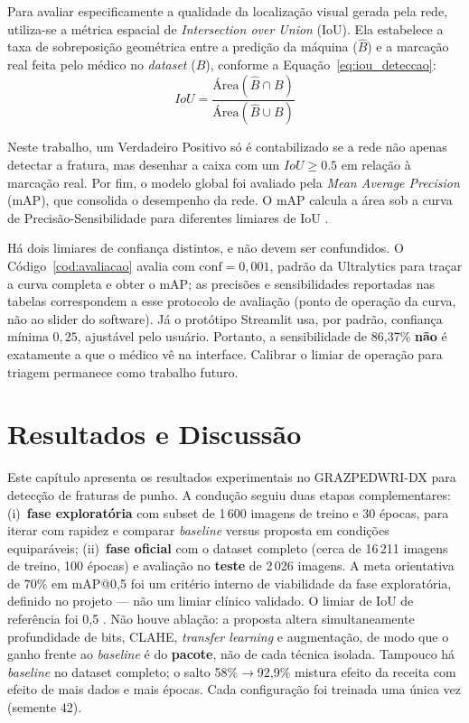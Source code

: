 \documentclass[12pt,oneside,a4paper,chapter=TITLE,section=TITLE,sumario=tradicional]{abntex2}
\begin{document}
Para avaliar especificamente a qualidade da localização visual gerada pela rede, utiliza-se a métrica espacial de \textit{Intersection over Union} (IoU). Ela estabelece a taxa de sobreposição geométrica entre a predição da máquina ($\hat{B}$) e a marcação real feita pelo médico no \textit{dataset} ($B$), conforme a Equação~\eqref{eq:iou_deteccao}:
\begin{equation}
\label{eq:iou_deteccao}
IoU = \frac{\text{Área}(\hat{B} \cap B)}{\text{Área}(\hat{B} \cup B)}
\end{equation}

Neste trabalho, um Verdadeiro Positivo só é contabilizado se a rede não apenas detectar a fratura, mas desenhar a caixa com um $IoU \geq 0.5$ em relação à marcação real. Por fim, o modelo global foi avaliado pela \textit{Mean Average Precision} (mAP), que consolida o desempenho da rede. O mAP calcula a área sob a curva de Precisão-Sensibilidade para diferentes limiares de IoU \cite{lin2014coco,kim2020,litjens2017survey}.

Há dois limiares de confiança distintos, e não devem ser confundidos. O Código~\ref{cod:avaliacao} avalia com $\mathrm{conf}=0{,}001$, padrão da Ultralytics para traçar a curva completa e obter o mAP; as precisões e sensibilidades reportadas nas tabelas correspondem a esse protocolo de avaliação (ponto de operação da curva, não ao slider do software). Já o protótipo Streamlit usa, por padrão, confiança mínima $0{,}25$, ajustável pelo usuário. Portanto, a sensibilidade de 86,37\% \textbf{não} é exatamente a que o médico vê na interface. Calibrar o limiar de operação para triagem permanece como trabalho futuro.

\chapter{Resultados e Discussão}
\label{cap:resultados}

Este capítulo apresenta os resultados experimentais no GRAZPEDWRI-DX para detecção de fraturas de punho. A condução seguiu duas etapas complementares: (i)~\textbf{fase exploratória} com subset de 1\,600 imagens de treino e 30 épocas, para iterar com rapidez e comparar \textit{baseline} versus proposta em condições equiparáveis; (ii)~\textbf{fase oficial} com o dataset completo (cerca de 16\,211 imagens de treino, 100 épocas) e avaliação no \textbf{teste} de 2\,026 imagens. A meta orientativa de 70\% em mAP@0,5 foi um critério interno de viabilidade da fase exploratória, definido no projeto --- não um limiar clínico validado. O limiar de IoU de referência foi 0,5 \cite{nagy2022grazpedwri,lin2014coco}. Não houve ablação: a proposta altera simultaneamente profundidade de bits, CLAHE, \textit{transfer learning} e augmentação, de modo que o ganho frente ao \textit{baseline} é do \textbf{pacote}, não de cada técnica isolada. Tampouco há \textit{baseline} no dataset completo; o salto 58\%$\rightarrow$92,9\% mistura efeito da receita com efeito de mais dados e mais épocas. Cada configuração foi treinada uma única vez (semente 42).
\end{document}
